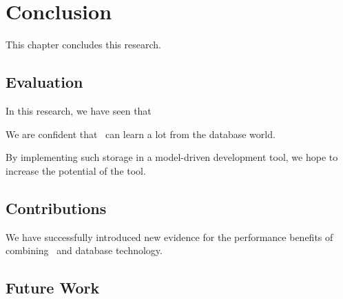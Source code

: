 \chapter{Conclusion}
\label{chap:Conclusion}
This chapter concludes this research. 

\clearpage

\section{Evaluation}
\label{sec:Evaluation}
In this research, we have seen that 

We are confident that \mdd~can learn a lot from the database world.

By implementing such storage in a model-driven development tool, we hope to increase the potential of the tool.

\section{Contributions}
\label{sec:Contributions}
We have successfully introduced new evidence for the performance benefits of combining \mdd~and database technology.

\section{Future Work}
\label{sec:Future Work}



